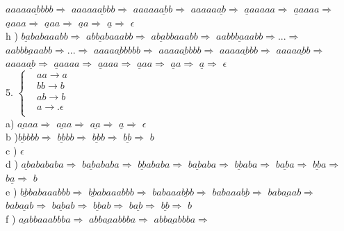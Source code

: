 \documentclass{article}
\begin{document}
$aaaaa\underline{ab}bbb \Rightarrow $
$aaaaa\underline{ab}bb \Rightarrow $
$aaaaa\underline{ab}b \Rightarrow $
$aaaaa\underline{ab} \Rightarrow $
$\underline{a}aaaaa \Rightarrow $
$\underline{a}aaaa \Rightarrow $
$\underline{a}aaa \Rightarrow $
$\underline{a}aa \Rightarrow $
$\underline{a}a \Rightarrow $
$\underline{a} \Rightarrow $
$\epsilon$
\\
h ) $\underline{ba}babaaabb \Rightarrow$
$ab\underline{ba}baaabb \Rightarrow$
$a\underline{ba}bbaaabb \Rightarrow$
$aabb\underline{ba}aabb \Rightarrow...\Rightarrow $
$aabb\underline{ba}aabb \Rightarrow...\Rightarrow $
$aaaa\underline{ab}bbbb \Rightarrow$
$aaaa\underline{ab}bbb \Rightarrow$
$aaaa\underline{ab}bb \Rightarrow$
$aaaa\underline{ab}b \Rightarrow$
$aaaa\underline{ab} \Rightarrow$
$\underline{a}aaaa \Rightarrow$
$\underline{a}aaa \Rightarrow$
$\underline{a}aa \Rightarrow$
$\underline{a}a \Rightarrow$
$\underline{a} \Rightarrow$
$\epsilon$
\\
5. $ \left\{
\begin{aligned}
&aa \rightarrow a \\
&bb \rightarrow b \\
&ab \rightarrow b \\
&a \rightarrow .\epsilon \\
\end{aligned}
\right.$ 
\\
a) $\underline{aa}aa \Rightarrow$
$\underline{aa}a \Rightarrow$
$\underline{aa} \Rightarrow$
$\underline{a} \Rightarrow$
$\epsilon$
\\
b )$\underline{bb}bbb \Rightarrow$ 
$\underline{bb}bb \Rightarrow$ 
$\underline{bb}b \Rightarrow$ 
$\underline{bb} \Rightarrow$ 
$b$
\\
c ) $\epsilon$
\\
d ) $\underline{ab}abababa \Rightarrow$
$b\underline{ab}ababa \Rightarrow$
$\underline{bb}ababa \Rightarrow$
$b\underline{ab}aba \Rightarrow$
$\underline{bb}aba \Rightarrow$
$b\underline{ab}a \Rightarrow$
$\underline{bb}a \Rightarrow$
$b\underline{a} \Rightarrow$
$b$
\\
e ) $\underline{bb}babaaabbb \Rightarrow$
$\underline{bb}abaaabbb \Rightarrow$
$babaaa\underline{bb}b \Rightarrow$
$babaaa\underline{bb} \Rightarrow$
$bab\underline{aa}ab \Rightarrow$
$bab\underline{aa}b \Rightarrow$
$b\underline{ab}ab \Rightarrow$
$\underline{bb}ab \Rightarrow$
$b\underline{ab} \Rightarrow$
$\underline{bb} \Rightarrow$
$b$
\\
f ) $\underline{aa}bbaaabbba \Rightarrow$
$abb\underline{aa}abbba \Rightarrow$
$abb\underline{aa}bbba \Rightarrow$
\end{document}
